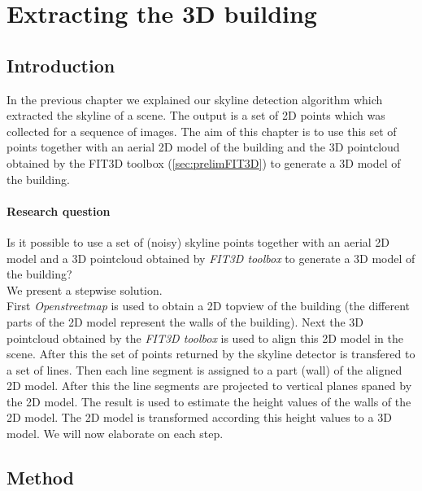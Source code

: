 


\section{Extracting the 3D building}
\label{sec:generate3dModel}
\subsection{Introduction}
In the previous chapter we explained our skyline detection algorithm which
extracted the skyline of a scene. The output is a set of 2D points which was  
collected for a sequence of images.
The aim of this chapter is to use this set of points together with an
 aerial 2D model of the building and the 3D pointcloud obtained by the FIT3D
 toolbox\cite{fit3d} (\ref{sec:prelimFIT3D}) to generate a 3D model of the
 building.


\paragraph{Research question}
Is it possible to use a set of (noisy) skyline points together with an aerial
2D model and a 3D pointcloud obtained by \emph{FIT3D toolbox\cite{fit3d}} to
generate a 3D model of the building?\\

We present a stepwise solution.\\ 
First \emph{Openstreetmap} is used to obtain a 2D topview of the building (the
different parts of the 2D model represent the walls of the building). Next the
3D pointcloud obtained by the \emph{FIT3D toolbox\cite{fit3d}} is used to align this 2D
model in the scene.  After this the set of points returned by the skyline
detector is transfered to a set of lines. Then each line segment is assigned to
a part (wall) of the aligned 2D model.  After this the line segments are
projected to vertical planes spaned by the 2D model.  The result is used to
estimate the height values of the walls of the 2D model. The 2D model is
transformed according this height values to a 3D
model. We will now elaborate on each step.\\


\subsection{Method}
